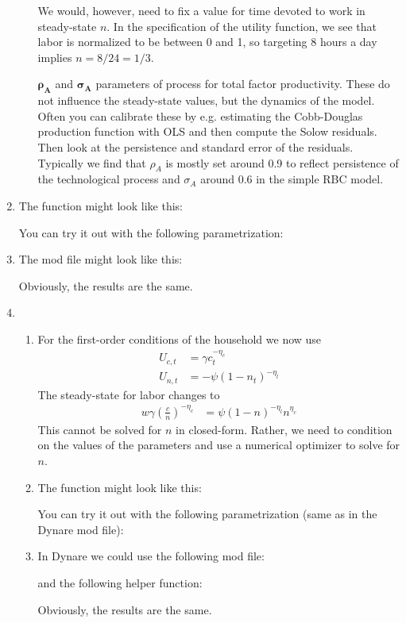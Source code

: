 \begin{enumerate}
\begin{itemize}
We would, however, need to fix a value for time devoted to work in steady-state $n$.
In the specification of the utility function, we see that labor is normalized to be between 0 and 1,
  so targeting 8 hours a day implies $n=8/24=1/3$.
\item[$\boldsymbol{\rho_A}$ and $\boldsymbol{\sigma_A}$] parameters of process for total factor productivity.
These do not influence the steady-state values, but the dynamics of the model.
Often you can calibrate these by e.g. estimating the Cobb-Douglas production function with OLS and then compute the Solow residuals.
Then look at the persistence and standard error of the residuals.
Typically we find that $\rho_A$ is mostly set around 0.9 to reflect persistence of the technological process
  and $\sigma_A$ around $0.6$ in the simple RBC model.
\end{itemize}
\item The function might look like this:

You can try it out with the following parametrization:

\item The mod file might look like this:

Obviously, the results are the same.
\item
\begin{enumerate}
	\item  For the first-order conditions of the household we now use
	\begin{align*}
	U_{c,t} &= \gamma c_t^{-\eta_c}
	\\
	U_{n,t} &= - \psi (1-n_t)^{-\eta_l}
	\end{align*}
	The steady-state for labor changes to
	\begin{align*}
	w \gamma \left(\frac{c}{n}\right)^{-\eta_c} &= \psi(1-n)^{-\eta_l}n^{\eta_c}
	\end{align*}
	This cannot be solved for $n$ in closed-form.
	Rather, we need to condition on the values of the parameters and use a numerical optimizer to solve for $n$.
	\item The function might look like this:
	
	You can try it out with the following parametrization (same as in the Dynare mod file):
	
	\item In Dynare we could use the following mod file:
	
	and the following helper function:
	
	Obviously, the results are the same.
\end{enumerate}

\end{enumerate}